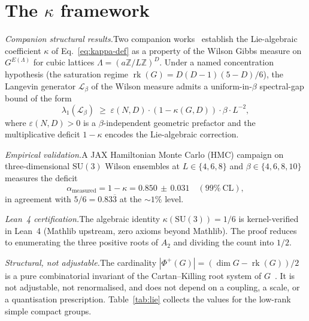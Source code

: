\documentclass[aps,prl,reprint,amsmath,amssymb,nofootinbib,floatfix,superscriptaddress]{revtex4-2}
\newcommand{\bbZ}{\mathbb{Z}}
\newcommand{\calL}{\mathcal{L}}
\newcommand{\rk}{\operatorname{rk}}
\newcommand{\SU}{\mathrm{SU}}
\newcommand{\Phiroots}{\Phi^{+}}
\begin{document}
\section{The $\kappa$ framework}
\label{sec:kappa}

\textit{Companion structural results.}\quad Two companion works~\cite{Remondiere2026a,Remondiere2026b} establish the Lie-algebraic coefficient $\kappa$ of Eq.~\eqref{eq:kappa-def} as a property of the Wilson Gibbs measure on $G^{E(\Lambda)}$ for cubic lattices $\Lambda = (a\bbZ/L\bbZ)^D$. Under a named concentration hypothesis (the saturation regime $\rk(G) = D(D-1)(5-D)/6$), the Langevin generator $\calL_\beta$ of the Wilson measure admits a uniform-in-$\beta$ spectral-gap bound of the form
\begin{equation}
\lambda_1(\calL_\beta) \;\ge\; \varepsilon(N, D) \cdot (1 - \kappa(G, D)) \cdot \beta \cdot L^{-2},
\label{eq:lsi}
\end{equation}
where $\varepsilon(N, D) > 0$ is a $\beta$-independent geometric prefactor and the multiplicative deficit $1 - \kappa$ encodes the Lie-algebraic correction.

\textit{Empirical validation.}\quad A JAX Hamiltonian Monte Carlo (HMC) campaign on three-dimensional $\SU(3)$ Wilson ensembles at $L \in \{4, 6, 8\}$ and $\beta \in \{4, 6, 8, 10\}$ measures the deficit
\begin{equation*}
\alpha_{\mathrm{measured}} = 1 - \kappa = 0.850 \,\pm\, 0.031 \quad (99\%\ \mathrm{CL}),
\end{equation*}
in agreement with $5/6 = 0.83\overline{3}$ at the ${\sim}1\%$ level.

\textit{Lean~4 certification.}\quad The algebraic identity $\kappa(\SU(3)) = 1/6$ is kernel-verified in Lean~4 (Mathlib upstream, zero axioms beyond Mathlib). The proof reduces to enumerating the three positive roots of $A_2$ and dividing the count into $1/2$.

\textit{Structural, not adjustable.}\quad The cardinality $|\Phiroots(G)| = (\dim G - \rk(G))/2$ is a pure combinatorial invariant of the Cartan--Killing root system of $G$~\cite{Bourbaki}. It is not adjustable, not renormalised, and does not depend on a coupling, a scale, or a quantisation prescription. Table~\ref{tab:lie} collects the values for the low-rank simple compact groups.
\end{document}
